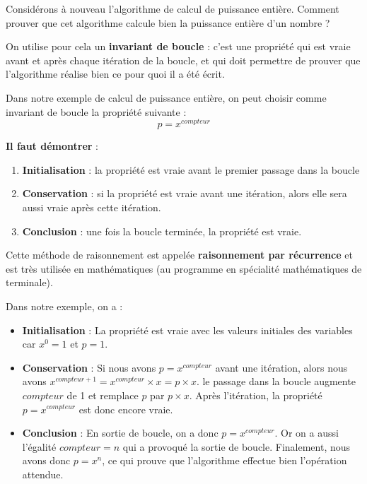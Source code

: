 \documentclass[
  a4paper,
  DIV=11,
  numbers=noendperiod]{scrartcl}
\providecommand{\tightlist}{%
  \setlength{\itemsep}{0pt}\setlength{\parskip}{0pt}}\usepackage{longtable,booktabs,array}
\begin{document}
Considérons à nouveau l'algorithme de calcul de puissance entière.
Comment prouver que cet algorithme calcule bien la puissance entière
d'un nombre ?

On utilise pour cela un \textbf{invariant de boucle} : c'est une
propriété qui est vraie avant et après chaque itération de la boucle, et
qui doit permettre de prouver que l'algorithme réalise bien ce pour quoi
il a été écrit.

Dans notre exemple de calcul de puissance entière, on peut choisir comme
invariant de boucle la propriété suivante : \[p=x^{compteur}\]

\begin{tcolorbox}[enhanced jigsaw, bottomrule=.15mm, leftrule=.75mm, opacitybacktitle=0.6, breakable, opacityback=0, toprule=.15mm, colback=white, toptitle=1mm, colbacktitle=quarto-callout-important-color!10!white, left=2mm, title=\textcolor{quarto-callout-important-color}{\faExclamation}\hspace{0.5em}{Pour prouver q'une propriété est un invariant de boucle\ldots{}}, colframe=quarto-callout-important-color-frame, arc=.35mm, rightrule=.15mm, titlerule=0mm, bottomtitle=1mm, coltitle=black]

\textbf{Il faut démontrer} :

\begin{enumerate}
\def\labelenumi{\arabic{enumi}.}
\tightlist
\item
  \textbf{Initialisation} : la propriété est vraie avant le premier
  passage dans la boucle
\item
  \textbf{Conservation} : si la propriété est vraie avant une itération,
  alors elle sera aussi vraie après cette itération.
\item
  \textbf{Conclusion} : une fois la boucle terminée, la propriété est
  vraie.
\end{enumerate}

\end{tcolorbox}

Cette méthode de raisonnement est appelée \textbf{raisonnement par
récurrence} et est très utilisée en mathématiques (au programme en
spécialité mathématiques de terminale).

Dans notre exemple, on a :

\begin{itemize}
\tightlist
\item
  \textbf{Initialisation} : La propriété est vraie avec les valeurs
  initiales des variables car \(x^0=1\) et \(p=1\).
\item
  \textbf{Conservation} : Si nous avons \(p=x^{compteur}\) avant une
  itération, alors nous avons
  \(x^{compteur+1}=x^{compteur}\times x = p\times x\). le passage dans
  la boucle augmente \(compteur\) de 1 et remplace \(p\) par
  \(p\times x\). Après l'itération, la propriété \(p=x^{compteur}\) est
  donc encore vraie.
\item
  \textbf{Conclusion} : En sortie de boucle, on a donc
  \(p=x^{compteur}\). Or on a aussi l'égalité \(compteur = n\) qui a
  provoqué la sortie de boucle. Finalement, nous avons donc \(p=x^n\),
  ce qui prouve que l'algorithme effectue bien l'opération attendue.
\end{itemize}
\end{document}
